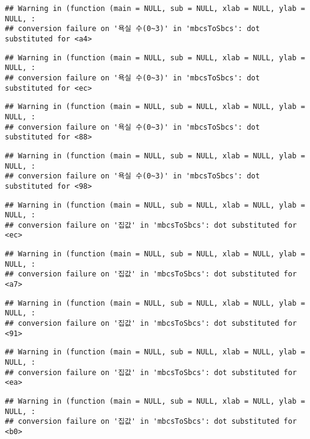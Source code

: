 \documentclass[
]{article}
\begin{document}
\begin{verbatim}
## Warning in (function (main = NULL, sub = NULL, xlab = NULL, ylab = NULL, :
## conversion failure on '욕실 수(0~3)' in 'mbcsToSbcs': dot substituted for <a4>
\end{verbatim}

\begin{verbatim}
## Warning in (function (main = NULL, sub = NULL, xlab = NULL, ylab = NULL, :
## conversion failure on '욕실 수(0~3)' in 'mbcsToSbcs': dot substituted for <ec>
\end{verbatim}

\begin{verbatim}
## Warning in (function (main = NULL, sub = NULL, xlab = NULL, ylab = NULL, :
## conversion failure on '욕실 수(0~3)' in 'mbcsToSbcs': dot substituted for <88>
\end{verbatim}

\begin{verbatim}
## Warning in (function (main = NULL, sub = NULL, xlab = NULL, ylab = NULL, :
## conversion failure on '욕실 수(0~3)' in 'mbcsToSbcs': dot substituted for <98>
\end{verbatim}

\begin{verbatim}
## Warning in (function (main = NULL, sub = NULL, xlab = NULL, ylab = NULL, :
## conversion failure on '집값' in 'mbcsToSbcs': dot substituted for <ec>
\end{verbatim}

\begin{verbatim}
## Warning in (function (main = NULL, sub = NULL, xlab = NULL, ylab = NULL, :
## conversion failure on '집값' in 'mbcsToSbcs': dot substituted for <a7>
\end{verbatim}

\begin{verbatim}
## Warning in (function (main = NULL, sub = NULL, xlab = NULL, ylab = NULL, :
## conversion failure on '집값' in 'mbcsToSbcs': dot substituted for <91>
\end{verbatim}

\begin{verbatim}
## Warning in (function (main = NULL, sub = NULL, xlab = NULL, ylab = NULL, :
## conversion failure on '집값' in 'mbcsToSbcs': dot substituted for <ea>
\end{verbatim}

\begin{verbatim}
## Warning in (function (main = NULL, sub = NULL, xlab = NULL, ylab = NULL, :
## conversion failure on '집값' in 'mbcsToSbcs': dot substituted for <b0>
\end{verbatim}
\end{document}
